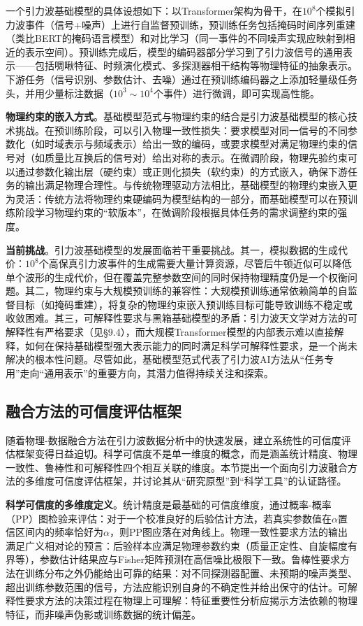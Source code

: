 一个引力波基础模型的具体设想如下：以Transformer架构为骨干，在$10^8$个模拟引力波事件（信号+噪声）上进行自监督预训练，预训练任务包括掩码时间序列重建（类比BERT的掩码语言模型）和对比学习（同一事件的不同噪声实现应映射到相近的表示空间）。预训练完成后，模型的编码器部分学习到了引力波信号的通用表示——包括啁啾特征、时频演化模式、多探测器相干结构等物理特征的抽象表示。下游任务（信号识别、参数估计、去噪）通过在预训练编码器之上添加轻量级任务头，并用少量标注数据（$10^3 \sim 10^4$个事件）进行微调，即可实现高性能。

\textbf{物理约束的嵌入方式}。基础模型范式与物理约束的结合是引力波基础模型的核心技术挑战。在预训练阶段，可以引入物理一致性损失：要求模型对同一信号的不同参数化（如时域表示与频域表示）给出一致的编码，或要求模型对满足物理约束的信号对（如质量比互换后的信号对）给出对称的表示。在微调阶段，物理先验约束可以通过参数化输出层（硬约束）或正则化损失（软约束）的方式嵌入，确保下游任务的输出满足物理合理性。与传统物理驱动方法相比，基础模型的物理约束嵌入更为灵活：传统方法将物理约束硬编码为模型结构的一部分，而基础模型可以在预训练阶段学习物理约束的“软版本”，在微调阶段根据具体任务的需求调整约束的强度。

\textbf{当前挑战}。引力波基础模型的发展面临若干重要挑战。其一，模拟数据的生成代价：$10^8$个高保真引力波事件的生成需要大量计算资源，尽管后牛顿近似可以降低单个波形的生成代价，但在覆盖完整参数空间的同时保持物理精度仍是一个权衡问题。其二，物理约束与大规模预训练的兼容性：大规模预训练通常依赖简单的自监督目标（如掩码重建），将复杂的物理约束嵌入预训练目标可能导致训练不稳定或收敛困难。其三，可解释性要求与黑箱基础模型的矛盾：引力波天文学对方法的可解释性有严格要求（见§9.4），而大规模Transformer模型的内部表示难以直接解释，如何在保持基础模型强大表示能力的同时满足科学可解释性要求，是一个尚未解决的根本性问题。尽管如此，基础模型范式代表了引力波AI方法从“任务专用”走向“通用表示”的重要方向，其潜力值得持续关注和探索。

\subsection{融合方法的可信度评估框架}

随着物理-数据融合方法在引力波数据分析中的快速发展，建立系统性的可信度评估框架变得日益迫切。科学可信度不是单一维度的概念，而是涵盖统计精度、物理一致性、鲁棒性和可解释性四个相互关联的维度。本节提出一个面向引力波融合方法的多维度可信度评估框架，并讨论其从“研究原型”到“科学工具”的认证路径。

\textbf{科学可信度的多维度定义}。统计精度是最基础的可信度维度，通过概率-概率（PP）图检验来评估：对于一个校准良好的后验估计方法，若真实参数值在$\alpha$置信区间内的频率恰好为$\alpha$，则PP图应落在对角线上。物理一致性要求方法的输出满足广义相对论的预言：后验样本应满足物理参数约束（质量正定性、自旋幅度有界等），参数估计结果应与Fisher矩阵预测在高信噪比极限下一致。鲁棒性要求方法在训练分布之外仍能给出可靠的结果：对不同探测器配置、未预期的噪声类型、超出训练参数范围的信号，方法应能识别自身的不确定性并给出保守的估计。可解释性要求方法的决策过程在物理上可理解：特征重要性分析应揭示方法依赖的物理特征，而非噪声伪影或训练数据的统计偏差。

